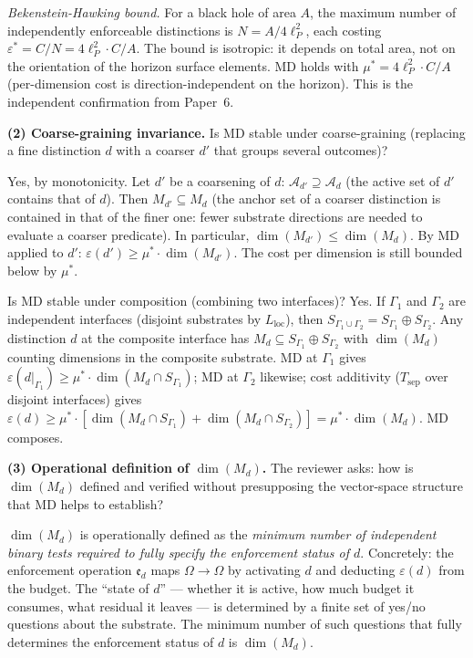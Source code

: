 \documentclass[11pt]{article}
\theoremstyle{remark}
\begin{document}
\textit{Bekenstein-Hawking bound.}  For a black hole of area $A$, the maximum number of independently enforceable distinctions is $N = A / 4\ell_P^2$, each costing $\varepsilon^* = C / N = 4\ell_P^2 \cdot C / A$.  The bound is isotropic: it depends on total area, not on the orientation of the horizon surface elements.  MD holds with $\mu^* = 4\ell_P^2 \cdot C/A$ (per-dimension cost is direction-independent on the horizon).  This is the independent confirmation from Paper~6.

\medskip\noindent\textbf{(2) Coarse-graining invariance.}  Is MD stable under coarse-graining (replacing a fine distinction $d$ with a coarser $d'$ that groups several outcomes)?

Yes, by monotonicity.  Let $d'$ be a coarsening of $d$: $\mathcal{A}_{d'} \supseteq \mathcal{A}_d$ (the active set of $d'$ contains that of $d$).  Then $M_{d'} \subseteq M_d$ (the anchor set of a coarser distinction is contained in that of the finer one: fewer substrate directions are needed to evaluate a coarser predicate).  In particular, $\dim(M_{d'}) \le \dim(M_d)$.  By MD applied to $d'$: $\varepsilon(d') \ge \mu^* \cdot \dim(M_{d'})$.  The cost per dimension is still bounded below by $\mu^*$.

Is MD stable under composition (combining two interfaces)?  Yes.  If $\Gamma_1$ and $\Gamma_2$ are independent interfaces (disjoint substrates by $L_{\mathrm{loc}}$), then $S_{\Gamma_1 \cup \Gamma_2} = S_{\Gamma_1} \oplus S_{\Gamma_2}$.  Any distinction $d$ at the composite interface has $M_d \subseteq S_{\Gamma_1} \oplus S_{\Gamma_2}$ with $\dim(M_d)$ counting dimensions in the composite substrate.  MD at $\Gamma_1$ gives $\varepsilon(d|_{\Gamma_1}) \ge \mu^* \cdot \dim(M_d \cap S_{\Gamma_1})$; MD at $\Gamma_2$ likewise; cost additivity ($T_{\mathrm{sep}}$ over disjoint interfaces) gives $\varepsilon(d) \ge \mu^* \cdot [\dim(M_d \cap S_{\Gamma_1}) + \dim(M_d \cap S_{\Gamma_2})] = \mu^* \cdot \dim(M_d)$.  MD composes.

\medskip\noindent\textbf{(3) Operational definition of $\dim(M_d)$.}  The reviewer asks: how is $\dim(M_d)$ defined and verified without presupposing the vector-space structure that MD helps to establish?

$\dim(M_d)$ is operationally defined as the \emph{minimum number of independent binary tests required to fully specify the enforcement status of $d$}.  Concretely: the enforcement operation $\mathfrak{e}_d$ maps $\Omega \to \Omega$ by activating $d$ and deducting $\varepsilon(d)$ from the budget.  The ``state of $d$'' --- whether it is active, how much budget it consumes, what residual it leaves --- is determined by a finite set of yes/no questions about the substrate.  The minimum number of such questions that fully determines the enforcement status of $d$ is $\dim(M_d)$.
\end{document}
